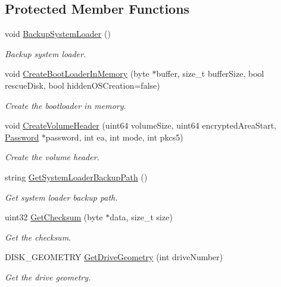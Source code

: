 \subsection*{Protected Member Functions}
\begin{DoxyCompactItemize}
\item 
void \hyperlink{class_gost_crypt_1_1_boot_encryption_a056b478fceb4e43f9492b9af91cc22c9}{Backup\+System\+Loader} ()
\begin{DoxyCompactList}\small\item\em Backup system loader. \end{DoxyCompactList}\item 
void \hyperlink{class_gost_crypt_1_1_boot_encryption_a7cb3765a4f32ccefdf5a49513e321c38}{Create\+Boot\+Loader\+In\+Memory} (byte $\ast$buffer, size\+\_\+t buffer\+Size, bool rescue\+Disk, bool hidden\+O\+S\+Creation=false)
\begin{DoxyCompactList}\small\item\em Create the bootloader in memory. \end{DoxyCompactList}\item 
void \hyperlink{class_gost_crypt_1_1_boot_encryption_aae1dcc499f3a4d2e1cc6019f5f6f8a69}{Create\+Volume\+Header} (uint64 volume\+Size, uint64 encrypted\+Area\+Start, \hyperlink{struct_password}{Password} $\ast$password, int ea, int mode, int pkcs5)
\begin{DoxyCompactList}\small\item\em Create the volume header. \end{DoxyCompactList}\item 
string \hyperlink{class_gost_crypt_1_1_boot_encryption_a0c4d3572b0222989e55734f6f939748e}{Get\+System\+Loader\+Backup\+Path} ()
\begin{DoxyCompactList}\small\item\em Get system loader backup path. \end{DoxyCompactList}\item 
uint32 \hyperlink{class_gost_crypt_1_1_boot_encryption_aa56a1b2fa3c5d43089ad74b99804babb}{Get\+Checksum} (byte $\ast$data, size\+\_\+t size)
\begin{DoxyCompactList}\small\item\em Get the checksum. \end{DoxyCompactList}\item 
D\+I\+S\+K\+\_\+\+G\+E\+O\+M\+E\+T\+RY \hyperlink{class_gost_crypt_1_1_boot_encryption_aacfb758834e184a992d9f6274d77cc2a}{Get\+Drive\+Geometry} (int drive\+Number)
\begin{DoxyCompactList}\small\item\em Get the drive geometry. \end{DoxyCompactList}\item 

\end{DoxyCompactItemize}
